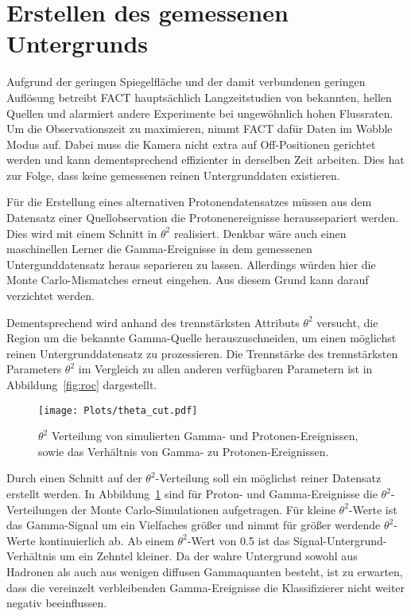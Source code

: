 \section{Erstellen des gemessenen Untergrunds}
\label{sec:makeUnter}
Aufgrund der geringen Spiegelfläche und der damit verbundenen geringen Auflösung betreibt FACT hauptsächlich Langzeitstudien von bekannten, hellen Quellen und alarmiert andere Experimente bei ungewöhnlich hohen Flussraten.
Um die Observationszeit zu maximieren, nimmt FACT dafür Daten im Wobble Modus auf. 
Dabei muss die Kamera nicht extra auf Off-Positionen gerichtet werden und kann dementsprechend effizienter in derselben Zeit arbeiten. 
Dies hat zur Folge, dass keine gemessenen reinen Untergrunddaten existieren. 

Für die Erstellung eines alternativen Protonendatensatzes müssen aus dem Datensatz einer Quellobservation die Protonenereignisse heraussepariert werden. 
Dies wird mit einem Schnitt in $\theta^{2}$ realisiert.
Denkbar wäre auch einen maschinellen Lerner die Gamma-Ereignisse in dem gemessenen Untergunddatensatz heraus separieren zu lassen.
Allerdings würden hier die Monte Carlo-Mismatches erneut eingehen. 
Aus diesem Grund kann darauf verzichtet werden.

Dementsprechend wird anhand des trennstärksten Attributs $\theta^{2}$ versucht, die Region um die bekannte Gamma-Quelle herauszuschneiden, um einen möglichst reinen Untergrunddatensatz zu prozessieren. 
Die Trennstärke des trennstärksten Parameters $\theta^{2}$ im Vergleich zu allen anderen verfügbaren Parametern ist in Abbildung~\ref{fig:roc} dargestellt. 
\begin{figure}[H]
  \centering
  \texttt{[image: Plots/theta\_cut.pdf]}
  \caption{$\theta^{2}$ Verteilung von simulierten Gamma- und Protonen-Ereignissen, sowie das Verhältnis von Gamma- zu Protonen-Ereignissen.}
  \label{fig:thetacut}
\end{figure}
Durch einen Schnitt auf der $\theta^{2}$-Verteilung soll ein möglichst reiner Datensatz erstellt werden. 
In Abbildung~\ref{fig:thetacut} sind für Proton- und Gamma-Ereignisse die $\theta^{2}$-Verteilungen der Monte Carlo-Simulationen aufgetragen. 
Für kleine $\theta^{2}$-Werte ist das Gamma-Signal um ein Vielfaches größer und nimmt für größer werdende $\theta^{2}$-Werte kontinuierlich ab. 
Ab einem $\theta^{2}$-Wert von \num{0.5} ist das Signal-Untergrund-Verhältnis um ein Zehntel kleiner.
Da der wahre Untergrund sowohl aus Hadronen als auch aus wenigen diffusen Gammaquanten besteht, ist zu erwarten, dass die vereinzelt verbleibenden Gamma-Ereignisse die Klassifizierer nicht weiter negativ beeinflussen.

